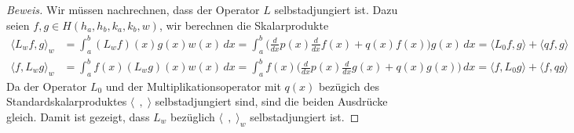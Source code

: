 \begin{proof}[Beweis]
Wir müssen nachrechnen, dass der Operator $L$ selbstadjungiert ist.
Dazu seien $f,g\in H(h_a,h_b,k_a,k_b,w)$, wir berechnen die
Skalarprodukte
\begin{align*}
\langle L_wf,g\rangle_w
&=
\int_a^b (L_wf)(x)g(x)w(x)\,dx
=
\int_a^b
\biggl(
\frac{d}{dx}p(x)\frac{d}{dx}f(x) + 
q(x) f(x)
\biggr) g(x)\,dx
=
\langle L_0f,g\rangle + \langle qf,g\rangle
\\
\langle f,L_wg\rangle_w
&=
\int_a^b f(x)(L_wg)(x)w(x)\,dx
=
\int_a^b
f(x)
\biggl(
\frac{d}{dx}p(x)\frac{d}{dx}g(x) + 
q(x) g(x)
\biggr) \,dx
=
\langle f,L_0g\rangle + \langle f,qg\rangle
\end{align*}
Da der Operator $L_0$ und der Multiplikationsoperator mit $q(x)$ bezügich
des Standardskalarproduktes $\langle\;\,,\;\rangle$ selbstadjungiert sind,
sind die beiden Ausdrücke gleich.
Damit ist gezeigt, dass $L_w$ bezüglich $\langle\;\,,\;\rangle_w$
selbstadjungiert ist.
\end{proof}
